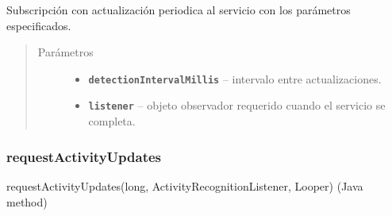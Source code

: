 \begin{fulllineitems}
\label{org/hardroid/api/ActivityRecognitionApi:org.hardroid.api.ActivityRecognitionApi.requestActivityUpdates(long, ActivityRecognitionListener)}\par
Subscripción con actualización periodica al servicio con los parámetros especificados.
\begin{quote}\begin{description}
\item[{Parámetros}] \leavevmode\begin{itemize}
\item {} 
\textbf{\texttt{detectionIntervalMillis}} -- intervalo entre actualizaciones. 

\item {} 
\textbf{\texttt{listener}} -- objeto observador requerido cuando el servicio se completa.

\end{itemize}

\end{description}\end{quote}

\end{fulllineitems}



\subsubsection{requestActivityUpdates}
\label{org/hardroid/api/ActivityRecognitionApi:id3}requestActivityUpdates(long, ActivityRecognitionListener, Looper) (Java method)

